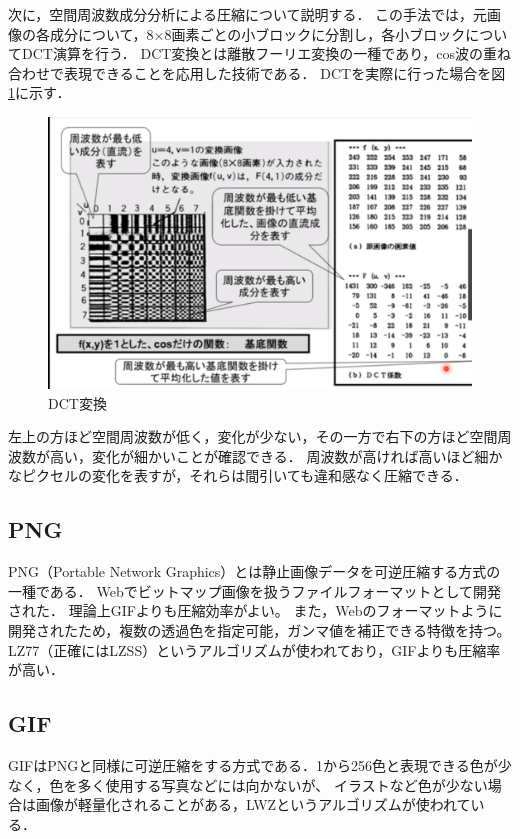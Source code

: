 \documentclass[a4paper,11pt]{bxjsarticle}
\begin{document}
次に，空間周波数成分分析による圧縮について説明する．
この手法では，元画像の各成分について，8×8画素ごとの小ブロックに分割し，各小ブロックについてDCT演算を行う．
DCT変換とは離散フーリエ変換の一種であり，cos波の重ね合わせで表現できることを応用した技術である．
DCTを実際に行った場合を図\ref{fig:dct}に示す．\cite{jpeg1}

\begin{figure}[htbp]
  \centering  %
  \includegraphics[clip,width = 12.0cm]{dct_con.eps}
  \caption{DCT変換}
  \label{fig:dct}
  \end{figure}

左上の方ほど空間周波数が低く，変化が少ない，その一方で右下の方ほど空間周波数が高い，変化が細かいことが確認できる．
周波数が高ければ高いほど細かなピクセルの変化を表すが，それらは間引いても違和感なく圧縮できる．



\subsection{PNG}
PNG（Portable Network Graphics）とは静止画像データを可逆圧縮する方式の一種である．
Webでビットマップ画像を扱うファイルフォーマットとして開発された．
理論上GIFよりも圧縮効率がよい。
また，Webのフォーマットように開発されたため，複数の透過色を指定可能，ガンマ値を補正できる特徴を持つ。
LZ77（正確にはLZSS）というアルゴリズムが使われており，GIFよりも圧縮率が高い．

 
\subsection{GIF}
GIFはPNGと同様に可逆圧縮をする方式である．1から256色と表現できる色が少なく，色を多く使用する写真などには向かないが、
イラストなど色が少ない場合は画像が軽量化されることがある，LWZというアルゴリズムが使われている．
\end{document}

